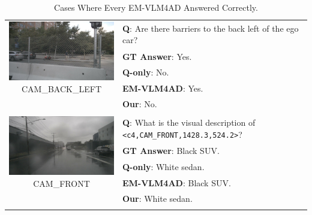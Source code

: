\documentclass{article} %
\begin{document}
\begin{table}[htbp]
    \centering
\begin{tabular}{cp{9cm}}

\multirow{4}{*}{\parbox{6cm}{
    \centering
    \includegraphics[width=6cm]{Figures/n008-2018-08-29-16-04-13-0400__CAM_BACK_LEFT__1535573956547405.jpg}\\
    {\tiny CAM\_BACK\_LEFT}
}}
& \textbf{Q}: Are there barriers to the back left of the ego car? \\
& \textbf{GT Answer}: Yes. \\
& \textbf{Q-only}: No. \\
& \textbf{EM-VLM4AD}: Yes. \\ 
& \textbf{Our}: No. \\
\vspace{3em} & \vspace{3em} \\

\multirow{4}{*}{\parbox{6cm}{
    \centering
    \includegraphics[width=6cm]{Figures/n008-2018-09-18-13-10-39-0400__CAM_FRONT__1537290748612404.jpg}\\
    {\tiny CAM\_FRONT}
}}
& \textbf{Q}: What is the visual description of \texttt{<c4,CAM\_FRONT,1428.3,524.2>}? \\
& \textbf{GT Answer}: Black SUV. \\
& \textbf{Q-only}: White sedan. \\
& \textbf{EM-VLM4AD}: Black SUV. \\ 
& \textbf{Our}: White sedan. \\
\vspace{2em} & \vspace{2em} \\
\end{tabular}
    \caption{Cases Where Every EM-VLM4AD Answered Correctly.}
    \label{tab:qualitative_examples_our}
\end{table}
\end{document}
